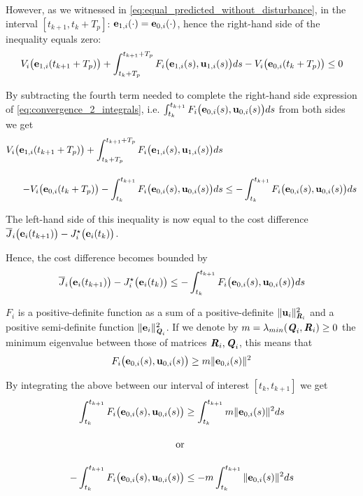 \begin{gg_box}
  However, as we witnessed in \eqref{eq:equal_predicted_without_disturbance},
  in the interval $[t_{k+1}, t_k + T_p]$:
  $\bm{\mathbf{e}}_{1,i}(\cdot) = \bm{\mathbf{e}}_{0,i}(\cdot)$, hence the right-hand
  side of the inequality equals zero:
  \begin{align}
    V_i\big(\bm{\mathbf{e}}_{1,i}(t_{k+1} + T_p)\big)
    + \int_{t_k + T_p}^{t_{k+1} + T_p} F_i\big(\bm{\mathbf{e}}_{1,i}(s), \bm{\mathbf{u}}_{1,i}(s)\big) ds
    - V_i\big(\bm{\mathbf{e}}_{0,i}(t_k + T_p)\big) \leq 0
  \end{align}

  By subtracting the fourth term needed to complete the right-hand side
  expression of \eqref{eq:convergence_2_integrals}, i.e.
  $\int_{t_k}^{t_{k+1}} F_i \big(\bm{\mathbf{e}}_{0,i}(s), \bm{\mathbf{u}}_{0,i} (s)\big) d s$
  from both sides we get
  \begin{align}
    V_i\big(\bm{\mathbf{e}}_{1,i}(t_{k+1} + T_p)\big)
    + \int_{t_k + T_p}^{t_{k+1} + T_p} F_i\big(\bm{\mathbf{e}}_{1,i}(s), \bm{\mathbf{u}}_{1,i}(s)\big) ds& \\[2.5ex]
    - V_i\big(\bm{\mathbf{e}}_{0,i}(t_k + T_p)\big)
    -\int_{t_k}^{t_{k+1}} F_i \big(\bm{\mathbf{e}}_{0,i}(s), \bm{\mathbf{u}}_{0,i} (s)\big) d s
    &\leq -\int_{t_k}^{t_{k+1}} F_i \big(\bm{\mathbf{e}}_{0,i}(s), \bm{\mathbf{u}}_{0,i} (s)\big) d s
  \end{align}

  The left-hand side of this inequality is now equal to the cost difference
  $\overline{J}_i\big(\bm{\mathbf{e}}_i(t_{k+1})\big) - J_i^{\star}\big(\bm{\mathbf{e}}_i(t_k)\big)$.
\end{gg_box}
Hence, the cost difference becomes bounded by
\begin{align}
  \overline{J}_i\big(\bm{\mathbf{e}}_i(t_{k+1})\big) - J_i^{\star}\big(\bm{\mathbf{e}}_i(t_k)\big) \leq
    -\int_{t_k}^{t_{k+1}} F_i \big(\bm{\mathbf{e}}_{0,i}(s), \bm{\mathbf{u}}_{0,i} (s)\big) ds
\end{align}
\begin{gg_box}
  $F_i$ is a positive-definite function as a sum of a positive-definite
  $\|\bm{\mathbf{u}}_i\|^2_{\bm{\mathit{R}}_i}$ and a positive semi-definite function
  $\|\bm{\mathbf{e}}_i\|^2_{\bm{\mathit{Q}}_i}$. If we denote by
  $m = \lambda_{min}(\bm{\mathit{Q}}_i, \bm{\mathit{R}}_i) \geq 0$ the minimum eigenvalue
  between those of matrices $\bm{\mathit{R}}_i, \bm{\mathit{Q}}_i$, this means that
  \begin{align}
    F_i \big(\bm{\mathbf{e}}_{0,i}(s), \bm{\mathbf{u}}_{0,i} (s)\big) \geq m \|\bm{\mathbf{e}}_{0,i}(s)\|^2
  \end{align}

  By integrating the above between our interval of interest $[t_k, t_{k+1}]$ we get
  \begin{align}
    \int_{t_k}^{t_{k+1}} F_i \big(\bm{\mathbf{e}}_{0,i}(s), \bm{\mathbf{u}}_{0,i} (s)\big) &\geq \int_{t_k}^{t_{k+1}} m \|\bm{\mathbf{e}}_{0,i}(s)\|^2 ds \\[2.5ex]
    \text{or}\\[2.5ex]
    -\int_{t_k}^{t_{k+1}} F_i \big(\bm{\mathbf{e}}_{0,i}(s), \bm{\mathbf{u}}_{0,i} (s)\big) &\leq -m \int_{t_k}^{t_{k+1}} \|\bm{\mathbf{e}}_{0,i}(s)\|^2 ds
  \end{align}
\end{gg_box}

